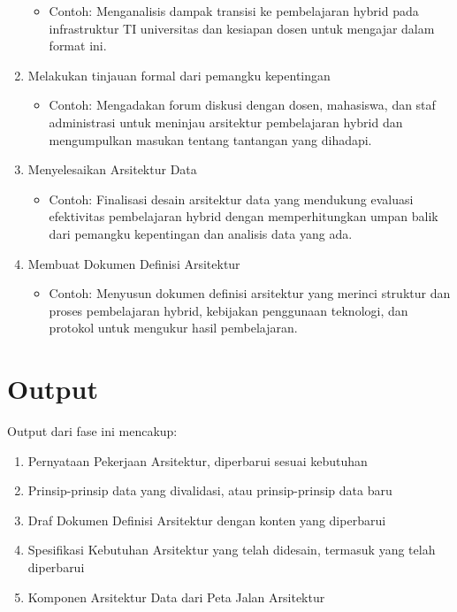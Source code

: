 \begin{enumerate}
	\begin{itemize}
		\item Contoh: Menganalisis dampak transisi ke pembelajaran hybrid pada infrastruktur TI universitas dan kesiapan dosen untuk mengajar dalam format ini.
	\end{itemize}
	\item Melakukan tinjauan formal dari pemangku kepentingan
	\begin{itemize}
		\item Contoh: Mengadakan forum diskusi dengan dosen, mahasiswa, dan staf administrasi untuk meninjau arsitektur pembelajaran hybrid dan mengumpulkan masukan tentang tantangan yang dihadapi.
	\end{itemize}
	\item Menyelesaikan Arsitektur Data
	\begin{itemize}
		\item Contoh: Finalisasi desain arsitektur data yang mendukung evaluasi efektivitas pembelajaran hybrid dengan memperhitungkan umpan balik dari pemangku kepentingan dan analisis data yang ada.
	\end{itemize}
	\item Membuat Dokumen Definisi Arsitektur
	\begin{itemize}
		\item Contoh: Menyusun dokumen definisi arsitektur yang merinci struktur dan proses pembelajaran hybrid, kebijakan penggunaan teknologi, dan protokol untuk mengukur hasil pembelajaran.
	\end{itemize}
\end{enumerate}


\section{Output}
Output dari fase ini mencakup:
\begin{enumerate}
	\item Pernyataan Pekerjaan Arsitektur, diperbarui sesuai kebutuhan
	\item Prinsip-prinsip data yang divalidasi, atau prinsip-prinsip data baru
	\item Draf Dokumen Definisi Arsitektur dengan konten yang diperbarui
	\item Spesifikasi Kebutuhan Arsitektur yang telah didesain, termasuk yang telah diperbarui
	\item Komponen Arsitektur Data dari Peta Jalan Arsitektur
\end{enumerate}


